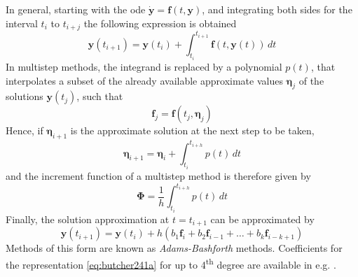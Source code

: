 In general, starting with the \gls{ode} $\bm{\dot{y}} = \bm{f}(t,\bm{y})$, and 
integrating both sides for the interval $t_i$ to $t_{i+j}$ the following expression 
is obtained
\begin{equation}\label{eq:mont442}
    \bm{y}(t_{i+1}) = \bm{y}(t_i) + \int_{t_i}^{t_{i+1}} \bm{f}(t,\bm{y}(t)) \,dt
\end{equation}
In multistep methods, the integrand is replaced by a polynomial $p(t)$, that interpolates 
a subset of the already available approximate values $\bm{\eta}_j$ of the solutions 
$\bm{y}(t_j)$, such that
\begin{equation}\label{eq:mont443}
    \bm{f}_j = \bm{f}(t_j, \bm{\eta}_j)
\end{equation}
Hence, if $\bm{\eta}_{i+1}$ is the approximate solution at the next step to be taken, 
\begin{equation}
    \bm{\eta}_{i+1} = \bm{\eta}_i + \int_{t_i}^{t_{i+h}} p(t) \,dt
\end{equation}
and the increment function of a multistep method is therefore given by
\begin{equation}\label{eq:mont445}
    \bm{\Phi} = \frac{1}{h} \int_{t_i}^{t_{i+h}} p(t) \,dt
\end{equation}
Finally, the solution approximation at $t=t_{i+1}$ can be approximated by
\begin{equation}\label{eq:butcher241a}
    \bm{y}(t_{i+1}) = \bm{y}(t_i) + h \left( b_1 \bm{f}_i + b_2 \bm{f}_{i-1} + \dots + b_k \bm{f}_{i-k+1} \right)
\end{equation}
Methods of this form are known as \emph{Adams-Bashforth} methods. Coefficients for 
the representation \autoref{eq:butcher241a} for up to 4\textsuperscript{th} degree 
are available in e.g. \cite{Butcher2016}.

